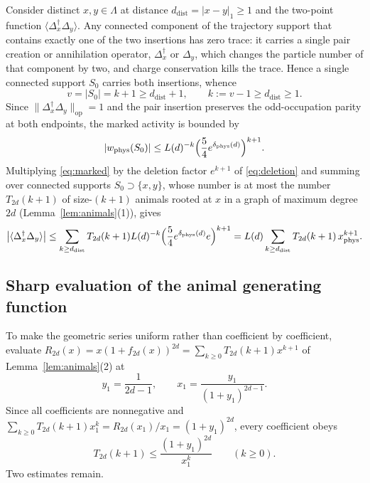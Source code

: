 \documentclass[11pt]{article}
\theoremstyle{plain}
\theoremstyle{definition}
\newcommand{\Dop}{\Delta}
\begin{document}
Consider distinct $x,y\in\Lambda$ at distance $d_{\mathrm{dist}}=|x-y|_1\ge1$ and the
two-point function $\langle\Dop_x^\dagger\Dop_y\rangle$. Any connected component of
the trajectory support that contains exactly one of the two insertions has zero
trace: it carries a single pair creation or annihilation operator, $\Dop_x^\dagger$ or
$\Dop_y$, which changes the particle number of that component by two, and charge
conservation kills the trace. Hence a single connected support $S_0$ carries both insertions, whence
\begin{equation}\label{eq:size}
 v=|S_0|=k+1\ge d_{\mathrm{dist}}+1,\qquad k:=v-1\ge d_{\mathrm{dist}}\ge1 .
\end{equation}
Since $\|\Dop_x^\dagger\Dop_y\|_{\mathrm{op}}=1$ and the pair insertion preserves the
odd-occupation parity at both endpoints, the marked activity is bounded by
\begin{equation}\label{eq:marked}
 |w_{\mathrm{phys}}(S_0)|\le L(d)^{-k}\Bigl(\frac54e^{\delta_{\mathrm{phys}}(d)}\Bigr)^{k+1}.
\end{equation}
Multiplying \eqref{eq:marked} by the deletion factor $e^{k+1}$ of
\eqref{eq:deletion} and summing over connected supports $S_0\supset\{x,y\}$, whose
number is at most the number $T_{2d}(k+1)$ of size-$(k+1)$ animals rooted at $x$ in a
graph of maximum degree $2d$ (Lemma~\ref{lem:animals}(1)), gives
\begin{equation}\label{eq:geometric}
 \bigl|\langle\Dop_x^\dagger\Dop_y\rangle\bigr|
 \le\sum_{k\ge d_{\mathrm{dist}}}T_{2d}(k+1)L(d)^{-k}
 \Bigl(\frac54e^{\delta_{\mathrm{phys}}(d)}e\Bigr)^{k+1}
 =L(d)\sum_{k\ge d_{\mathrm{dist}}}T_{2d}(k+1)\,x_{\mathrm{phys}}^{k+1}.
\end{equation}

\subsection{Sharp evaluation of the animal generating function}

To make the geometric series uniform rather than coefficient by coefficient, evaluate
$R_{2d}(x)=x(1+f_{2d}(x))^{2d}=\sum_{k\ge0}T_{2d}(k+1)x^{k+1}$ of
Lemma~\ref{lem:animals}(2) at
\begin{equation}\label{eq:y1}
 y_1=\frac1{2d-1},\qquad
 x_1=\frac{y_1}{(1+y_1)^{2d-1}}.
\end{equation}
Since all coefficients are nonnegative and
$\sum_{k\ge0}T_{2d}(k+1)x_1^k=R_{2d}(x_1)/x_1=(1+y_1)^{2d}$, every coefficient obeys
\begin{equation}\label{eq:coeff}
 T_{2d}(k+1)\le\frac{(1+y_1)^{2d}}{x_1^k}\qquad(k\ge0).
\end{equation}
Two estimates remain.
\end{document}
